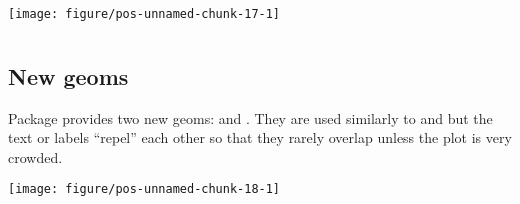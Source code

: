 \documentclass[paper=a4,10pt,div=17,headsepline,BCOR=12mm,twoside,open=right]{scrbook}\usepackage{knitr}
\begin{document}
\begin{knitrout}\footnotesize
{}\color{fgcolor}\begin{kframe}
\begin{alltt}
\hlopt{$} \hlkwb{<-} \hlopt{$} \hlopt{>=} \hlstd{,} \hlstd{,} \hlstd{)}
    \hlopt{+}
  \hlstd{()} \hlopt{+}
  \hlstd{(} \hlstd{=} \hlstd{,}  \hlstd{=} \hlstd{(}\hlstd{))}
\end{alltt}
\end{kframe}

{\centering \texttt{[image: figure/pos-unnamed-chunk-17-1]} 

}



\end{knitrout}

\section[ggrepel]{\ggrepel}

\subsection{New geoms}

Package \ggrepel provides two new geoms:  and . They are used similarly to  and  but the text or labels ``repel'' each other so that they rarely overlap unless the plot is very crowded.

\begin{knitrout}\footnotesize
{}\color{fgcolor}\begin{kframe}
\begin{alltt}
  \hlopt{+}
  \hlstd{()} \hlopt{+}
  \hlstd{(} \hlstd{=} \hlstd{,}  \hlstd{=} \hlstd{)}
\end{alltt}
\end{kframe}

{\centering \texttt{[image: figure/pos-unnamed-chunk-18-1]} 

}



\end{knitrout}
\end{document}
